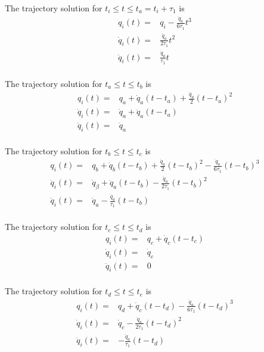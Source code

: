 The trajectory solution for $t_i \leq t \leq t_a = t_i + τ_1$ is
\begin{equation}
\begin{aligned}
q_i(t) ={}& q_i - \frac{\ddot{q}_{a}}{6τ_1}t^3 \\
\dot{q}_i(t) ={}& \frac{\ddot{q}_{a}}{2τ_1}t^2 \\
\ddot{q}_i(t) ={}& \frac{\ddot{q}_{a}}{τ_1}t \\
\end{aligned}
\end{equation}

The trajectory solution for $t_a \leq t \leq t_b$ is
\begin{equation}
\begin{aligned}
q_i(t) ={}& q_a + \dot{q}_a(t-t_a) + \frac{\ddot{q}_a}{2}(t-t_a)^2 \\
\dot{q}_i(t) ={}& \dot{q}_a + \ddot{q}_a(t-t_a) \\
\ddot{q}_i(t) ={}& \ddot{q}_a \\
\end{aligned}
\end{equation}

The trajectory solution for $t_b \leq t \leq t_c$ is
\begin{equation}
\begin{aligned}
q_i(t) ={}& q_b + \dot{q}_b(t-t_b) + \frac{\ddot{q}_a}{2}(t-t_b)^2 - \frac{\ddot{q}_a}{6τ_1}(t-t_b)^3 \\
\dot{q}_i(t) ={}& \dot{q}_β + \ddot{q}_a(t-t_b) - \frac{\ddot{q}_a}{2τ_1}(t-t_b)^2 \\
\ddot{q}_i(t) ={}& \ddot{q}_a - \frac{\ddot{q}_a}{τ_1}(t-t_b) \\
\end{aligned}
\end{equation}

The trajectory solution for $t_c \leq t \leq t_d$ is
\begin{equation}
\begin{aligned}
q_i(t) ={}& q_c + \dot{q}_c(t-t_c) \\
\dot{q}_i(t) ={}& \dot{q}_c \\
\ddot{q}_i(t) ={}& 0 \\
\end{aligned}
\end{equation}

The trajectory solution for $t_d \leq t \leq t_e$ is
\begin{equation}
\begin{aligned}
q_i(t) ={}& q_d + \dot{q}_c(t-t_d) - \frac{\ddot{q}_a}{6τ_1}(t-t_d)^3 \\
\dot{q}_i(t) ={}& \dot{q}_c - \frac{\ddot{q}_a}{2τ_1}(t-t_d)^2 \\
\ddot{q}_i(t) ={}& -\frac{\ddot{q}_a}{τ_1}(t-t_d) \\
\end{aligned}
\end{equation}

